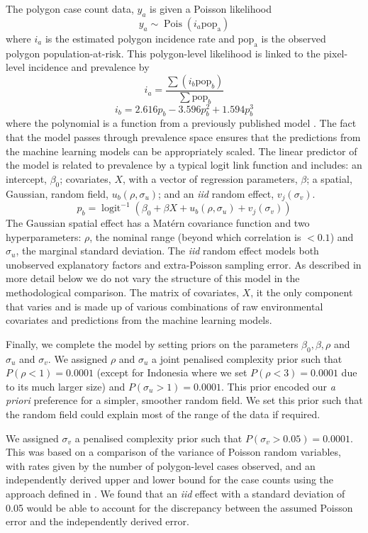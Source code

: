 \documentclass[review]{elsarticle}
\begin{document}
The polygon case count data, $y_a$ is given a Poisson likelihood
$$y_a \sim \operatorname{Pois}(i_a\mathrm{pop_a})$$
where $i_a$ is the estimated polygon incidence rate and $\mathrm{pop_a}$ is the observed polygon population-at-risk. 
This polygon-level likelihood is linked to the pixel-level incidence and prevalence by
$$i_a = \frac{ \sum(i_b \mathrm{pop}_b)}{\sum  \mathrm{pop}_b} $$
$$i_b = 2.616p_b - 3.596p_b^2 + 1.594p_b^3$$
where the polynomial is  a function from a previously published model \citep{cameron2015defining}.
The fact that the model passes through prevalence space ensures that the predictions from the machine learning models can be appropriately scaled.
The linear predictor of the model is related to prevalence by a typical logit link function and includes: an intercept, $\beta_0$; covariates, $X$, with a vector of regression parameters, $\beta$; a spatial, Gaussian, random field, $u_b(\rho, \sigma_u)$; and an \emph{iid} random effect, $v_j(\sigma_v)$.
$$p_b = \operatorname{logit}^{-1}\left(\beta_0 + \beta X  + u_b\left(\rho, \sigma_u\right) + v_j\left(\sigma_v\right)\right)$$
The Gaussian spatial effect has a Mat\'ern covariance function and two hyperparameters: $\rho$, the nominal range (beyond which correlation is $< 0.1$) and $\sigma_u$, the marginal standard deviation.
The \emph{iid} random effect models both unobserved explanatory factors and extra-Poisson sampling error.
As described in more detail below we do not vary the structure of this model in the methodological comparison.
The matrix of covariates, $X$, it the only component that varies and is made up of various combinations of raw environmental covariates and predictions from the machine learning models.

Finally, we complete the model by setting priors on the parameters $\beta_0, \beta, \rho$ and $\sigma_u$ and $\sigma_v$. 
We assigned $\rho$ and $\sigma_u$ a joint penalised complexity prior \citep{fuglstad2018constructing} such that $P(\rho < 1) = 0.0001$ (except for Indonesia where we set $P(\rho < 3) = 0.0001$ due to its much larger size) and $P(\sigma_u > 1) = 0.0001$. 
This prior encoded our \emph{a priori} preference for a simpler, smoother random field.
We set this prior such that the random field could explain most of the range of the data if required.

We assigned $\sigma_v$ a penalised complexity prior \citep{simpson2017penalising} such that $P(\sigma_v > 0.05) =  0.0001$. 
This was based on a comparison of the variance of Poisson random variables, with rates given by the number of polygon-level cases observed, and an independently derived upper and lower bound for the case counts using the approach defined in \citep{cibulskis2011worldwide}. 
We found that an \emph{iid} effect with a standard deviation of 0.05 would be able to account for the discrepancy between the assumed Poisson error and the independently derived error.
\end{document}
